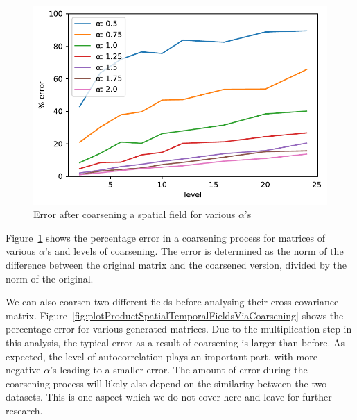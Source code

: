 \documentclass{acm_proc_article-sp}
\begin{document}
\begin{figure}[h]
\begin{center}
\includegraphics[width=0.8\columnwidth]{Results/plotSingleSpatialFieldViaCoarsening.pdf}
\caption[Error after coarsening a spatial field]{Error after coarsening a spatial field for various $\alpha$'s}
\label{fig:plotSingleSpatialFieldViaCoarsening}
\end{center}
\end{figure}
\vspace{-3mm}
Figure~\ref{fig:plotSingleSpatialFieldViaCoarsening} shows the percentage error in a coarsening process for matrices of various $\alpha$'s and levels of coarsening. The error is determined as the norm of the difference between the original matrix and the coarsened version, divided by the norm of the original.

We can also coarsen two different fields before analysing their cross-covariance matrix. Figure~\ref{fig:plotProductSpatialTemporalFieldsViaCoarsening} shows the percentage error for various generated matrices.
Due to the multiplication step in this analysis, the typical error as a result of coarsening is larger than before. As expected, the level of autocorrelation plays an important part, with more negative $\alpha$'s leading to a smaller error. The amount of error during the coarsening process will likely also depend on the similarity between the two datasets. This is one aspect which we do not cover here and leave for further research.
\end{document}
